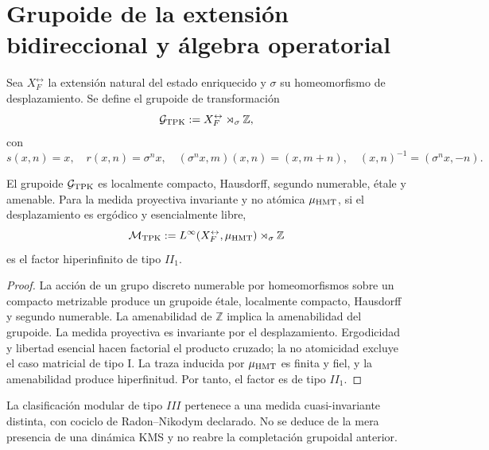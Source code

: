 \section{Grupoide de la extensión bidireccional y álgebra operatorial}
\label{sec:cpe-grupoide-two-way}

Sea \(X_F^{\leftrightarrow}\) la extensión natural del estado enriquecido y
\(\sigma\) su homeomorfismo de desplazamiento. Se define el grupoide de
transformación
\begin{equation}
 \mathcal G_{\rm TPK}
 :=X_F^{\leftrightarrow}\rtimes_\sigma\mathbb Z,
 \label{eq:cpe-grupoide-tpk}
\end{equation}
con
\[
 s(x,n)=x,
 \quad r(x,n)=\sigma^n x,
 \quad (\sigma^nx,m)(x,n)=(x,m+n),
 \quad (x,n)^{-1}=(\sigma^nx,-n).
\]

\begin{theorem}
\label{thm:cpe-grupoide-tpk}
El grupoide \(\mathcal G_{\rm TPK}\) es localmente compacto, Hausdorff,
segundo numerable, étale y amenable. Para la medida proyectiva invariante y
no atómica \(\mu_{\rm HMT}\), si el desplazamiento es ergódico y
esencialmente libre,
\[
 \mathcal M_{\rm TPK}
 :=L^\infty(X_F^{\leftrightarrow},\mu_{\rm HMT})
 \rtimes_\sigma\mathbb Z
\]
es el factor hiperinfinito de tipo \(II_1\).
\end{theorem}

\begin{proof}
La acción de un grupo discreto numerable por homeomorfismos sobre un compacto
metrizable produce un grupoide étale, localmente compacto, Hausdorff y
segundo numerable. La amenabilidad de \(\mathbb Z\) implica la amenabilidad
del grupoide. La medida proyectiva es invariante por el desplazamiento.
Ergodicidad y libertad esencial hacen factorial el producto cruzado; la no
atomicidad excluye el caso matricial de tipo I. La traza inducida por
\(\mu_{\rm HMT}\) es finita y fiel, y la amenabilidad produce
hiperfinitud. Por tanto, el factor es de tipo \(II_1\).
\end{proof}

La clasificación modular de tipo \(III\) pertenece a una medida
cuasi-invariante distinta, con cociclo de Radon--Nikodym declarado. No se
deduce de la mera presencia de una dinámica KMS y no reabre la completación
grupoidal anterior.
